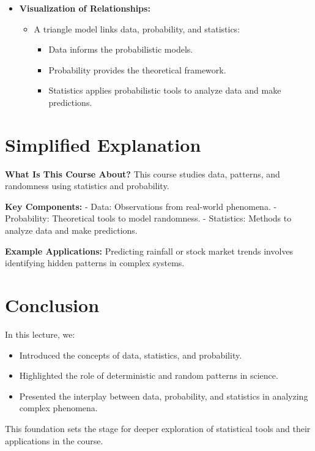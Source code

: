 \documentclass{article}
\begin{document}
\begin{itemize}
  \item \textbf{Visualization of Relationships:}
    \begin{itemize}
      \item A triangle model links data, probability, and statistics:
        \begin{itemize}
          \item Data informs the probabilistic models.
          \item Probability provides the theoretical framework.
          \item Statistics applies probabilistic tools to analyze data and make predictions.
        \end{itemize}
    \end{itemize}
\end{itemize}

\section*{Simplified Explanation}

\textbf{What Is This Course About?}
This course studies data, patterns, and randomness using statistics and probability.

\textbf{Key Components:}
- Data: Observations from real-world phenomena.
- Probability: Theoretical tools to model randomness.
- Statistics: Methods to analyze data and make predictions.

\textbf{Example Applications:}
Predicting rainfall or stock market trends involves identifying hidden patterns in complex systems.

\section*{Conclusion}

In this lecture, we:
\begin{itemize}
  \item Introduced the concepts of data, statistics, and probability.
  \item Highlighted the role of deterministic and random patterns in science.
  \item Presented the interplay between data, probability, and statistics in analyzing complex phenomena.
\end{itemize}

This foundation sets the stage for deeper exploration of statistical tools and their applications in the course.
\end{document}
